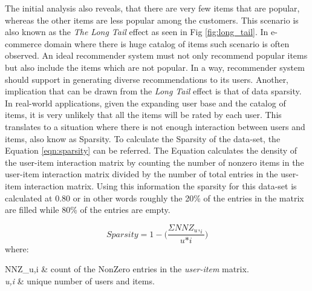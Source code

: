 The initial analysis also reveals, that there are very few items that are popular, whereas the other items are less popular among the customers. This scenario is also known as the \textit{The Long Tail} effect as seen in Fig \ref{fig:long_tail}.  In e-commerce domain where there is huge catalog of items such scenario is often observed. An ideal recommender system must not only recommend popular items but also include the items which are not popular. In a way, recommender system should support in generating diverse recommendations to its users. Another, implication that can be drawn from the \textit{Long Tail} effect is that of data sparsity. In real-world applications, given the expanding user base and the catalog of items, it is very unlikely that all the items will be rated by each user. This translates to a situation where there is not enough interaction between users and items, also know as Sparsity. To calculate the Sparsity of the data-set, the Equation \ref{eqn:sparsity} can be referred. The Equation calculates the density of the user-item interaction matrix by counting the number of nonzero items in the user-item interaction matrix divided by the number of total entries in the user-item interaction matrix. Using this information the sparsity for this data-set is calculated at 0.80 or in other words roughly the 20{\%} of the entries in the matrix are filled while 80{\%} of the entries are empty.

\begin{equation}
\label{eqn:sparsity}  Sparsity= 1- {\Big(\frac{\Sigma{NNZ_u,_i}}{\textit{u*i}}\Big)}
\end{equation}
where:
\begin{conditions}
 NNZ_{u,i}     &  count of the NonZero entries in the \textit{user-item} matrix. \\   
 \textit{u,i} &  unique number of users and items.
\end{conditions}
\\

